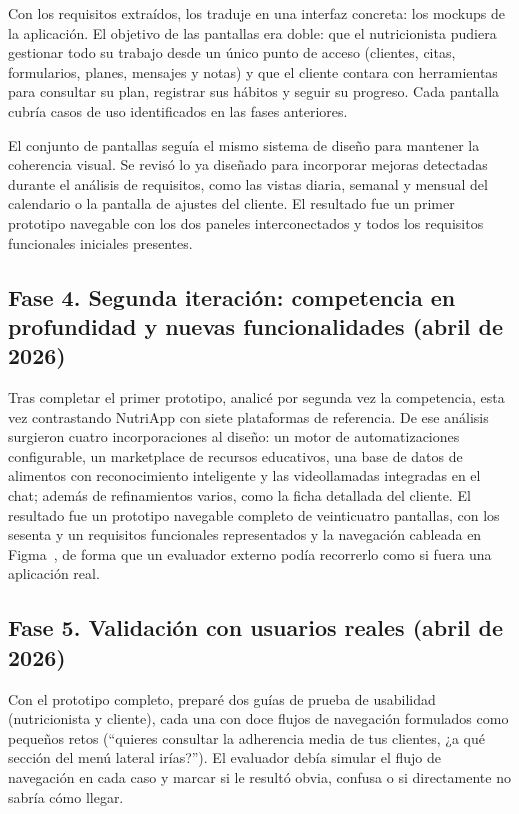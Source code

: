 Con los requisitos extraídos, los traduje en una interfaz concreta: los mockups de la aplicación. El objetivo de las pantallas era doble: que el nutricionista pudiera gestionar todo su trabajo desde un único punto de acceso (clientes, citas, formularios, planes, mensajes y notas) y que el cliente contara con herramientas para consultar su plan, registrar sus hábitos y seguir su progreso. Cada pantalla cubría casos de uso identificados en las fases anteriores.

El conjunto de pantallas seguía el mismo sistema de diseño para mantener la coherencia visual. Se revisó lo ya diseñado para incorporar mejoras detectadas durante el análisis de requisitos, como las vistas diaria, semanal y mensual del calendario o la pantalla de ajustes del cliente. El resultado fue un primer prototipo navegable con los dos paneles interconectados y todos los requisitos funcionales iniciales presentes.

\subsection*{Fase 4. Segunda iteración: competencia en profundidad y nuevas funcionalidades (abril de 2026)}

Tras completar el primer prototipo, analicé por segunda vez la competencia, esta vez contrastando NutriApp con siete plataformas de referencia. De ese análisis surgieron cuatro incorporaciones al diseño: un motor de automatizaciones configurable, un marketplace de recursos educativos, una base de datos de alimentos con reconocimiento inteligente y las videollamadas integradas en el chat; además de refinamientos varios, como la ficha detallada del cliente. El resultado fue un prototipo navegable completo de veinticuatro pantallas, con los sesenta y un requisitos funcionales representados y la navegación cableada en Figma~\citep{figma}, de forma que un evaluador externo podía recorrerlo como si fuera una aplicación real.

\subsection*{Fase 5. Validación con usuarios reales (abril de 2026)}

Con el prototipo completo, preparé dos guías de prueba de usabilidad (nutricionista y cliente), cada una con doce flujos de navegación formulados como pequeños retos (``quieres consultar la adherencia media de tus clientes, ¿a qué sección del menú lateral irías?''). El evaluador debía simular el flujo de navegación en cada caso y marcar si le resultó obvia, confusa o si directamente no sabría cómo llegar.

